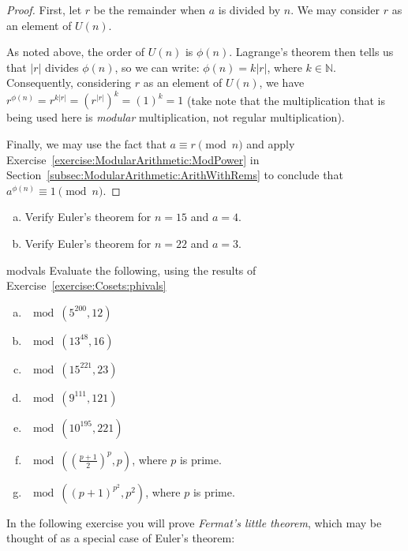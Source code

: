 \begin{proof}
First, let $r$ be the remainder when $a$ is divided by $n$. We may consider $r$ as an element of $U(n)$.

As noted above, the order of $U(n)$ is $\phi(n)$.  Lagrange's theorem then tells us that $|r|$ divides $\phi(n)$, so we can write: $\phi(n) = k|r|$, where $k \in {\mathbb N}$.   Consequently, considering $r$ as an element of $U(n)$, we have $r^{\phi(n)} = r^{k|r|} = (r^{|r|})^k = (1)^k=1$ (take note that the multiplication that is being used here is \emph{modular} multiplication, not regular multiplication). 

Finally, we may use  the fact that $a \equiv r \pmod{n}$ and apply Exercise~\ref{exercise:ModularArithmetic:ModPower} in Section~\ref{subsec:ModularArithmetic:ArithWithRems} to conclude that $a^{\phi(n)} \equiv 1 \pmod{n}$.

\hspace*{0.5in}
\end{proof}

\begin{exercise}{}
\begin{enumerate}[(a)]
\item
Verify Euler's theorem for $n = 15$ and $a = 4$.
\item
Verify Euler's theorem for $n = 22$ and $a = 3$.
\end{enumerate}
\end{exercise}


\begin{exercise}{modvals}
Evaluate the following, using the results of Exercise~\ref{exercise:Cosets:phivals}
\begin{multicols}{2}
\begin{enumerate}[(a)]
\item
$\mod(5^{200},12)$
\item
$\mod(13^{48},16)$
\item
$\mod(15^{221},23)$
\item
$\mod(9^{111},121)$
\item
$\mod(10^{195},221)$
\item
$\mod \left( \left( \frac{p+1}{2} \right)^p,p\right)$, where $p$ is prime.
\item
$\mod ( (p+1)^{p^2},p^2)$, where $p$ is prime.
\end{enumerate}
\end{multicols}
\end{exercise}

In the following exercise you will prove \emph{Fermat's little theorem}, which may be thought of as a special case of Euler's theorem:

